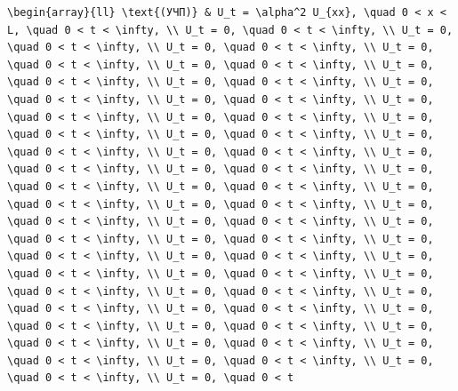 \documentclass[
  ukrainian,
]{article}
\begin{document}
\begin{verbatim}
\begin{array}{ll} \text{(УЧП)} & U_t = \alpha^2 U_{xx}, \quad 0 < x < L, \quad 0 < t < \infty, \\ U_t = 0, \quad 0 < t < \infty, \\ U_t = 0, \quad 0 < t < \infty, \\ U_t = 0, \quad 0 < t < \infty, \\ U_t = 0, \quad 0 < t < \infty, \\ U_t = 0, \quad 0 < t < \infty, \\ U_t = 0, \quad 0 < t < \infty, \\ U_t = 0, \quad 0 < t < \infty, \\ U_t = 0, \quad 0 < t < \infty, \\ U_t = 0, \quad 0 < t < \infty, \\ U_t = 0, \quad 0 < t < \infty, \\ U_t = 0, \quad 0 < t < \infty, \\ U_t = 0, \quad 0 < t < \infty, \\ U_t = 0, \quad 0 < t < \infty, \\ U_t = 0, \quad 0 < t < \infty, \\ U_t = 0, \quad 0 < t < \infty, \\ U_t = 0, \quad 0 < t < \infty, \\ U_t = 0, \quad 0 < t < \infty, \\ U_t = 0, \quad 0 < t < \infty, \\ U_t = 0, \quad 0 < t < \infty, \\ U_t = 0, \quad 0 < t < \infty, \\ U_t = 0, \quad 0 < t < \infty, \\ U_t = 0, \quad 0 < t < \infty, \\ U_t = 0, \quad 0 < t < \infty, \\ U_t = 0, \quad 0 < t < \infty, \\ U_t = 0, \quad 0 < t < \infty, \\ U_t = 0, \quad 0 < t < \infty, \\ U_t = 0, \quad 0 < t < \infty, \\ U_t = 0, \quad 0 < t < \infty, \\ U_t = 0, \quad 0 < t < \infty, \\ U_t = 0, \quad 0 < t < \infty, \\ U_t = 0, \quad 0 < t < \infty, \\ U_t = 0, \quad 0 < t < \infty, \\ U_t = 0, \quad 0 < t < \infty, \\ U_t = 0, \quad 0 < t < \infty, \\ U_t = 0, \quad 0 < t < \infty, \\ U_t = 0, \quad 0 < t < \infty, \\ U_t = 0, \quad 0 < t < \infty, \\ U_t = 0, \quad 0 < t < \infty, \\ U_t = 0, \quad 0 < t < \infty, \\ U_t = 0, \quad 0 < t < \infty, \\ U_t = 0, \quad 0 < t 
\end{verbatim}
\end{document}
